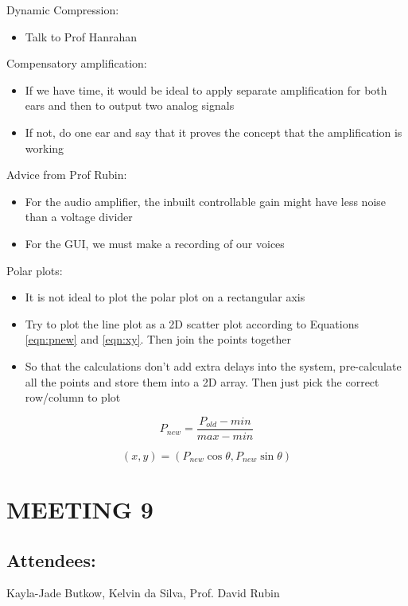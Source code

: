 \documentclass[10pt,onecolumn]{witseiepaper}
\begin{document}
Dynamic Compression:
\begin{itemize}
	\item Talk to Prof Hanrahan
\end{itemize}

Compensatory amplification:
\begin{itemize}
	\item If we have time, it would be ideal to apply separate amplification for both ears and then to output two analog signals
	\item If not, do one ear and say that it proves the concept that the amplification is working 
\end{itemize}

Advice from Prof Rubin:
\begin{itemize}
	\item For the audio amplifier, the inbuilt controllable gain might have less noise than a voltage divider
	\item For the GUI, we must make a recording of our voices
\end{itemize}

Polar plots:
\begin{itemize}
	\item It is not ideal to plot the polar plot on a rectangular axis
	\item Try to plot the line plot as a 2D scatter plot according to Equations \ref{eqn:pnew} and \ref{eqn:xy}. Then join the points together
	\item So that the calculations don't add extra delays into the system, pre-calculate all the points and store them into a 2D array. Then just pick the correct row/column to plot
\end{itemize}

\begin{equation}
P_{new}= \frac{P_{old} - min}{max - min} 
\label{eqn:pnew}
\end{equation}

\begin{equation}
(x,y)= (P_{new}\cos \theta, P_{new}\sin \theta)
\label{eqn:xy}
\end{equation}

\section*{MEETING 9}
\subsection*{Attendees:}
Kayla-Jade Butkow, Kelvin da Silva, Prof. David Rubin
\end{document}
